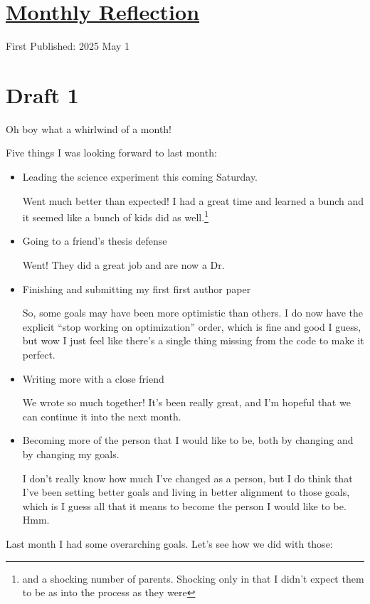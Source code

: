 \documentclass[12pt]{article}
\newcommand{\say}[1]{``#1''}
\renewcommand{\,}{\textsuperscript{,}}
\begin{document}
  
\doublespacing  
\section{\href{reflection-april-25.html}{Monthly Reflection}}  
First Published: 2025 May 1

\section{Draft 1}

Oh boy what a whirlwind of a month!

Five things I was looking forward to last month:  
\begin{itemize}   
\item Leading the science experiment this coming Saturday.

Went much better than expected! I had a great time and learned a bunch and it seemed like a bunch of kids did as well.\footnote{and a shocking number of parents. Shocking only in that I didn't expect them to be as into the process as they were}

\item Going to a friend's thesis defense

Went! They did a great job and are now a Dr.  
\item Finishing and submitting my first first author paper

So, some goals may have been more optimistic than others.  
I do now have the explicit \say{stop working on optimization} order, which is fine and good I guess, but wow I just feel like there's a single thing missing from the code to make it perfect.

\item Writing more with a close friend

We wrote so much together!  
It's been really great, and I'm hopeful that we can continue it into the next month.

\item Becoming more of the person that I would like to be, both by changing and by changing my goals.

I don't really know how much I've changed as a person, but I do think that I've been setting better goals and living in better alignment to those goals, which is I guess all that it means to become the person I would like to be.  
Hmm.  
\end{itemize}

Last month I had some overarching goals.  
Let's see how we did with those:
\end{document}
